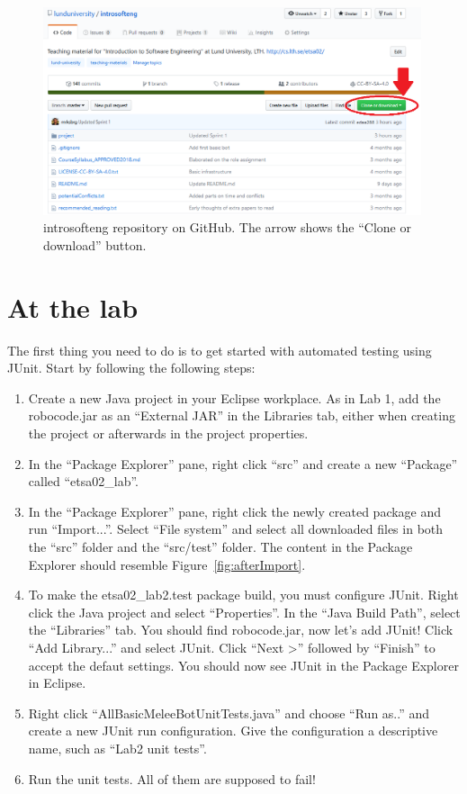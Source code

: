\documentclass{scrreprt}
\begin{document}
\begin{figure}
\centering
\includegraphics[width=0.99\textwidth]{figures/GitHub.png}
\caption{introsofteng repository on GitHub. The arrow shows the ``Clone or download'' button.}
\label{fig:github}
\end{figure}

\chapter{At the lab}
The first thing you need to do is to get started with automated testing using JUnit. Start by following the following steps:
\begin{enumerate}
\item Create a new Java project in your Eclipse workplace. As in Lab 1, add the robocode.jar as an ``External JAR'' in the Libraries tab, either when creating the project or afterwards in the project properties.
\item In the ``Package Explorer'' pane, right click ``src'' and create a new ``Package'' called ``etsa02_lab''.
\item In the ``Package Explorer'' pane, right click the newly created package and run ``Import...''. Select ``File system'' and select all downloaded files in both the ``src'' folder and the ``src/test'' folder. The content in the Package Explorer should resemble Figure~\ref{fig:afterImport}.
\item To make the etsa02_lab2.test package build, you must configure JUnit. Right click the Java project and select ``Properties''. In the ``Java Build Path'', select the ``Libraries'' tab. You should find robocode.jar, now let's add JUnit! Click ``Add Library...'' and select JUnit. Click ``Next >'' followed by ``Finish'' to accept the defaut settings. You should now see JUnit in the Package Explorer in Eclipse.
\item Right click ``AllBasicMeleeBotUnitTests.java'' and choose ``Run as..'' and create a new JUnit run configuration. Give the configuration a descriptive name, such as ``Lab2 unit tests''.
\item Run the unit tests. All of them are supposed to fail!
\end{enumerate}
\end{document}
